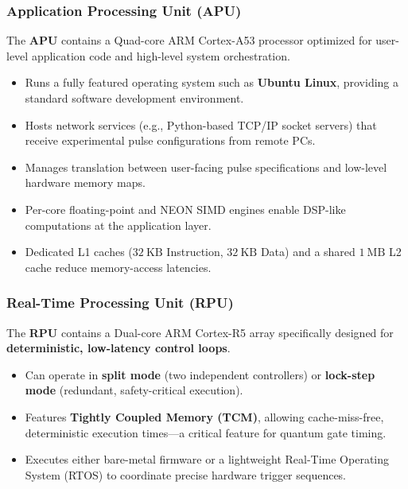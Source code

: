\documentclass[
]{article}
\providecommand{\tightlist}{%
  \setlength{\itemsep}{0pt}\setlength{\parskip}{0pt}}
\begin{document}
\subsubsection{Application Processing Unit
(APU)}\label{application-processing-unit-apu-1}

The \textbf{APU} contains a Quad-core ARM Cortex-A53 processor optimized
for user-level application code and high-level system orchestration.

\begin{itemize}
\tightlist
\item
  Runs a fully featured operating system such as \textbf{Ubuntu Linux},
  providing a standard software development environment.
\item
  Hosts network services (e.g., Python-based TCP/IP socket servers) that
  receive experimental pulse configurations from remote PCs.
\item
  Manages translation between user-facing pulse specifications and
  low-level hardware memory maps.
\item
  Per-core floating-point and NEON SIMD engines enable DSP-like
  computations at the application layer.
\item
  Dedicated L1 caches (\(32\ \text{KB}\) Instruction, \(32\ \text{KB}\)
  Data) and a shared \(1\ \text{MB}\) L2 cache reduce memory-access
  latencies.
\end{itemize}

\subsubsection{Real-Time Processing Unit
(RPU)}\label{real-time-processing-unit-rpu-1}

The \textbf{RPU} contains a Dual-core ARM Cortex-R5 array specifically
designed for \textbf{deterministic, low-latency control loops}.

\begin{itemize}
\tightlist
\item
  Can operate in \textbf{split mode} (two independent controllers) or
  \textbf{lock-step mode} (redundant, safety-critical execution).
\item
  Features \textbf{Tightly Coupled Memory (TCM)}, allowing
  cache-miss-free, deterministic execution times---a critical feature
  for quantum gate timing.
\item
  Executes either bare-metal firmware or a lightweight Real-Time
  Operating System (RTOS) to coordinate precise hardware trigger
  sequences.
\end{itemize}
\end{document}
